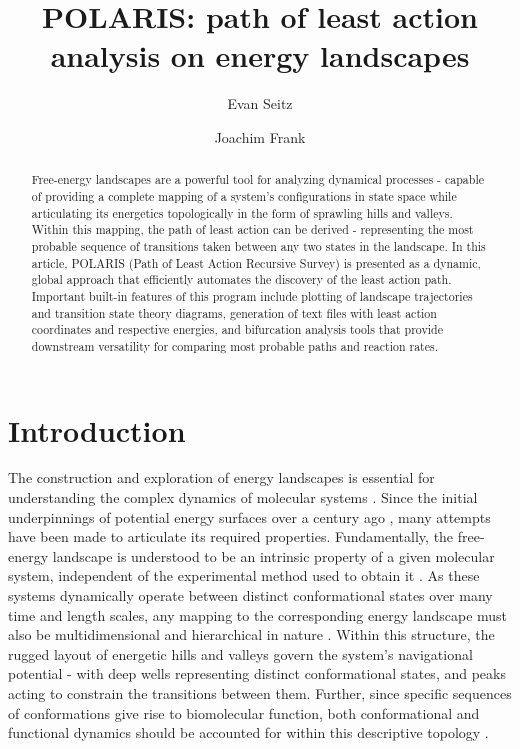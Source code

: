 \documentclass[twocolumn]{biophys-new}
\title{POLARIS: path of least action analysis on energy landscapes}
\author[1]{Evan Seitz}
\author[1,*]{Joachim Frank}
\affil[1]{Department of Biological Sciences, Columbia University, New York, NY 10032, USA}
\affil[2]{Department of Biochemistry and Molecular Biophysics, Columbia University Medical Center, New York, NY 10032, USA}
\begin{document}
\begin{frontmatter}

\begin{abstract}
Free-energy landscapes are a powerful tool for analyzing dynamical processes - capable of providing a complete mapping of a system's configurations in state space while articulating its energetics topologically in the form of sprawling hills and valleys. Within this mapping, the path of least action can be derived - representing the most probable sequence of transitions taken between any two states in the landscape. In this article, POLARIS (Path of Least Action Recursive Survey) is presented as a dynamic, global approach that efficiently automates the discovery of the least action path. Important built-in features of this program include plotting of landscape trajectories and transition state theory diagrams, generation of text files with least action coordinates and respective energies, and bifurcation analysis tools that provide downstream versatility for comparing most probable paths and reaction rates.

\end{abstract}

\end{frontmatter}

\section*{Introduction}
The construction and exploration of energy landscapes is essential for understanding the complex dynamics of molecular systems \cite{wales2003}. Since the initial underpinnings of potential energy surfaces over a century ago \cite{LS}, many attempts have been made to articulate its required properties. Fundamentally, the free-energy landscape is understood to be an intrinsic property of a given molecular system, independent of the experimental method used to obtain it \cite{whitford24}. As these systems dynamically operate between distinct conformational states over many time and length scales, any mapping to the corresponding energy landscape must also be multidimensional and hierarchical in nature \cite{munro}. Within this structure, the rugged layout of energetic hills and valleys govern the system's navigational potential - with deep wells representing distinct conformational states, and peaks acting to constrain the transitions between them. Further, since specific sequences of conformations give rise to biomolecular function, both conformational and functional dynamics should be accounted for within this descriptive topology \cite{whitford2012}.
\end{document}
